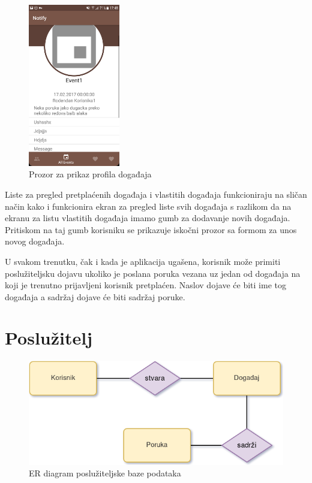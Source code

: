\documentclass[times, utf8, zavrsni]{fer}
\begin{document}
{\begin{figure}[htb]
\centering
\includegraphics[width=4cm]{img/ss-event-profile.png}
\caption{Prozor za prikaz profila događaja}
\label{fig:user-event-image}
\end{figure}

Liste za pregled pretplaćenih događaja i vlastitih događaja funkcioniraju na sličan način kako i funkcionira ekran za pregled liste svih događaja s razlikom da na ekranu za listu vlastitih događaja imamo gumb za dodavanje novih događaja. Pritiskom na taj gumb korisniku se prikazuje iskočni prozor sa formom za unos novog događaja.

U svakom trenutku, čak i kada je aplikacija ugašena, korisnik može primiti poslužiteljsku dojavu ukoliko je poslana poruka vezana uz jedan od događaja na koji je trenutno prijavljeni korisnik pretplaćen. Naslov dojave će biti ime tog događaja a sadržaj dojave će biti sadržaj poruke.

\section{Poslužitelj}

\begin{figure}[htb]
\centering
\includegraphics[width=\linewidth]{img/er.png}
\caption{ER diagram poslužiteljske baze podataka}
\label{fig:er-model-image}
\end{figure}

}
\end{document}
